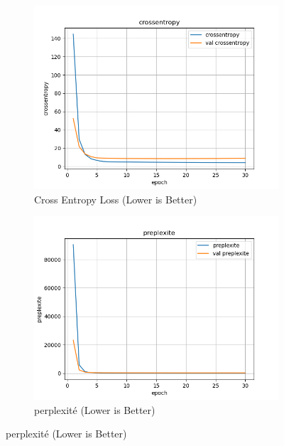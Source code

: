 \documentclass[a4paper]{article}
\begin{document}
\begin{figure}[ht]
  \centering
  \begin{subfigure}{0.47\textwidth}
    \includegraphics[width=\linewidth]{../logs/learnfromscratch_1/crossentropy.png}
    \caption{Cross Entropy Loss (Lower is Better)}
  \end{subfigure}
  \hfill
  \begin{subfigure}{0.47\textwidth}
    \includegraphics[width=\linewidth]{../logs/learnfromscratch_1/preplexite.png}
    \caption{perplexité (Lower is Better)}
  \end{subfigure}


\end{figure}
\end{document}

